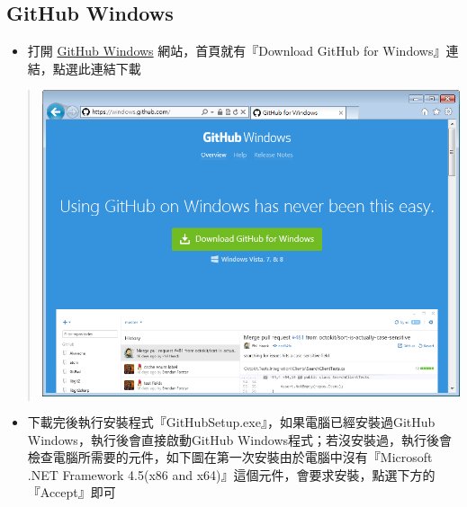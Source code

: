 \documentclass[letterpaper,10pt,english]{sphinxmanual}
\begin{document}
\subsection{GitHub Windows}
\label{_doc/writing/index-github:id6}\begin{itemize}
\item {} 
打開 \href{https://windows.github.com/}{GitHub Windows} 網站，首頁就有『Download GitHub for Windows』連結，點選此連結下載

\end{itemize}
\begin{quote}

\includegraphics{GitHub-Install-001.png}
\end{quote}
\begin{itemize}
\item {} 
下載完後執行安裝程式『GitHubSetup.exe』，如果電腦已經安裝過GitHub Windows，執行後會直接啟動GitHub Windows程式；若沒安裝過，執行後會檢查電腦所需要的元件，如下圖在第一次安裝由於電腦中沒有『Microsoft .NET Framework 4.5(x86 and x64)』這個元件，會要求安裝，點選下方的『Accept』即可

\end{itemize}
\end{document}
